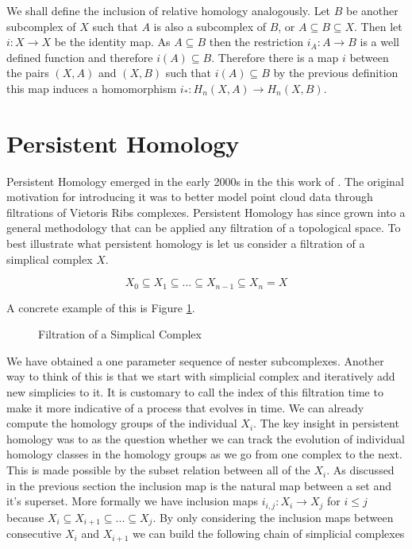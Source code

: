 We shall define the inclusion of relative homology analogously. Let $B$ be another subcomplex of $X$ such that $A$ is also a subcomplex of $B$, or $A \subseteq B \subseteq X$. Then let $i : X \to X$ be the identity map. As $A \subseteq B$ then the restriction $i_A: A \to B$ is a well defined function and therefore $i(A) \subseteq B$. Therefore there is a map $i$ between the pairs $(X, A)$ and $(X, B)$ such that $i(A) \subseteq B$ by the previous definition this map induces a homomorphism $i_* : H_n(X, A) \to H_n(X, B)$.



\section{Persistent Homology}


Persistent Homology emerged in the early 2000s in the this work of \cite{persistence-original}. The original motivation for introducing it was to better model point cloud data through filtrations of Vietoris Ribs complexes. Persistent Homology has since grown into a general methodology that can be applied any filtration of a topological space. To best illustrate what persistent homology is let us consider a filtration of a simplical complex $X$. 

$$ X_0 \subseteq X_1 \subseteq ... \subseteq X_{n-1} \subseteq X_n = X$$

A concrete example of this is Figure \ref{fig:filt-sc}.


\begin{figure}%
    \centering
    \caption{Filtration of a Simplical Complex}%
    \label{fig:filt-sc}%
\end{figure}

We have obtained a one parameter sequence of nester subcomplexes. Another way to think of this is that we start with simplicial complex and iteratively add new simplicies to it. It is customary to call the index of this filtration time to make it more indicative of a process that evolves in time. We can already compute the homology groups of the individual $X_i$. The key insight in persistent homology was to as the question whether we can track the evolution of individual homology classes in the homology groups as we go from one complex to the next. This is made possible by the subset relation between all of the $X_i$. As discussed in the previous section the inclusion map is the natural map between a set and it's superset. More formally we have inclusion maps $i_{i, j}: X_i \to X_j$ for $i \le j$ because $X_i \subseteq X_{i+1} \subseteq ... \subseteq X_j$. 
By only considering the inclusion maps between consecutive $X_i$ and $X_{i+1}$ we can build the following chain of simplicial complexes


